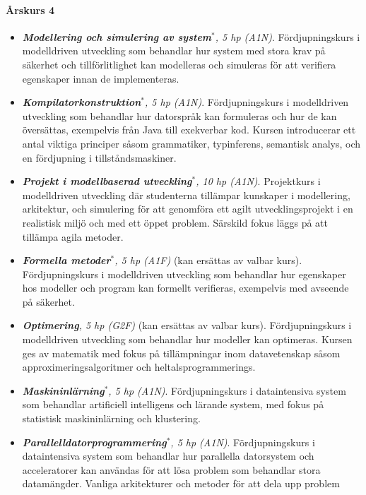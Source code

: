 \paragraph*{Årskurs 4}

\begin{itemize}
\tightlist
\item
  \emph{\textbf{Modellering och simulering av system}$^*$, 5 hp (A1N)}.
  Fördjupningskurs i modelldriven utveckling som behandlar hur system
  med stora krav på säkerhet och tillförlitlighet kan modelleras
  och simuleras för att verifiera egenskaper innan de implementeras.
\item
  \emph{\textbf{Kompilatorkonstruktion}$^*$, 5 hp (A1N)}. Fördjupningskurs i
  modelldriven utveckling som behandlar hur datorspråk kan formuleras
  och hur de kan översättas, exempelvis från Java till exekverbar kod.
  Kursen introducerar ett antal viktiga principer såsom grammatiker,
  typinferens, semantisk analys, och en fördjupning i
  tillståndsmaskiner.
\item
  \emph{\textbf{Projekt i modellbaserad utveckling}$^*$, 10 hp (A1N)}. Projektkurs
  i modelldriven utveckling där studenterna tillämpar kunskaper i
  modellering, arkitektur, och simulering för att genomföra ett agilt
  utvecklingsprojekt i en realistisk miljö och med ett öppet problem.
  Särskild fokus läggs på att tillämpa agila metoder.
\item
  \emph{\textbf{Formella metoder}$^*$, 5 hp (A1F)} (kan ersättas av valbar
  kurs). Fördjupningskurs i modelldriven utveckling som behandlar hur
  egenskaper hos modeller och program kan formellt verifieras, exempelvis med
  avseende på säkerhet.
\item
  \emph{\textbf{Optimering}, 5 hp (G2F)} (kan ersättas av valbar kurs).
  Fördjupningskurs i modelldriven utveckling som behandlar hur modeller
  kan optimeras. Kursen ges av matematik med fokus på tillämpningar inom
  datavetenskap såsom approximeringsalgoritmer och heltalsprogrammerings.
\item
  \emph{\textbf{Maskininlärning}$^*$, 5 hp (A1N)}. Fördjupningskurs i
  dataintensiva system som behandlar artificiell intelligens och lärande
  system, med fokus på statistisk maskininlärning och klustering.
\item
  \emph{\textbf{Parallelldatorprogrammering}$^*$, 5 hp (A1N)}. Fördjupningskurs i
  dataintensiva system som behandlar hur parallella datorsystem och
  acceleratorer kan användas för att lösa problem som behandlar stora
  datamängder. Vanliga arkitekturer och metoder för att dela upp problem

\end{itemize}

